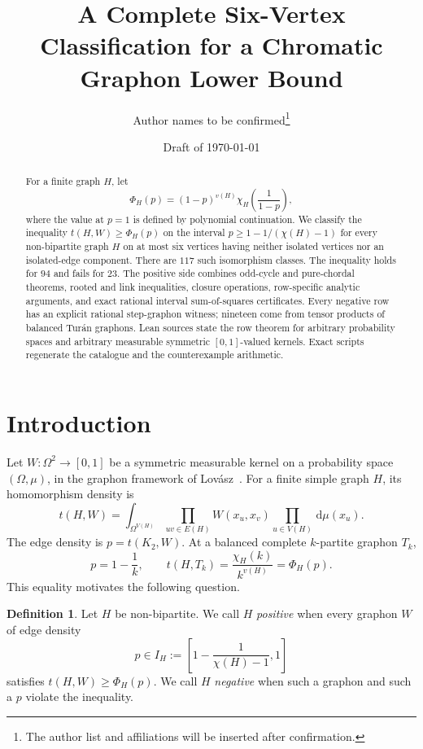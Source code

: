 \documentclass[11pt]{article}
\title{A Complete Six-Vertex Classification for a Chromatic Graphon Lower Bound}
\author{Author names to be confirmed\thanks{The author list and affiliations will be inserted after confirmation.}}
\date{Draft of \today}
\numberwithin{equation}{section}
\theoremstyle{definition}
\newtheorem{definition}[theorem]{Definition}
\theoremstyle{remark}
\newcommand{\dd}{\,\mathrm d}
\begin{document}
\maketitle

\begin{abstract}
For a finite graph $H$, let
\[
 \Phi_H(p)=(1-p)^{v(H)}\chi_H\!\left(\frac1{1-p}\right),
\]
where the value at $p=1$ is defined by polynomial continuation.  We classify
the inequality $t(H,W)\geq\Phi_H(p)$ on the interval
$p\geq1-1/(\chi(H)-1)$ for every non-bipartite graph $H$ on at most six
vertices having neither isolated vertices nor an isolated-edge component.
There are $117$ such isomorphism classes.  The inequality holds for $94$ and
fails for $23$.  The positive side combines odd-cycle and pure-chordal
theorems, rooted and link inequalities, closure operations, row-specific
analytic arguments, and exact rational interval sum-of-squares certificates.
Every negative row has an explicit rational step-graphon witness; nineteen
come from tensor products of balanced Tur\'{a}n graphons.  Lean sources state
the row theorem for arbitrary probability spaces and arbitrary measurable
symmetric $[0,1]$-valued kernels.  Exact scripts regenerate the catalogue and
the counterexample arithmetic.
\end{abstract}

\section{Introduction}

Let $W\colon\Omega^2\to[0,1]$ be a symmetric measurable kernel on a
probability space $(\Omega,\mu)$, in the graphon framework of
Lov\'asz~\cite{Lovasz2012}.  For a finite simple graph $H$, its
homomorphism density is
\begin{equation}
 t(H,W)=\int_{\Omega^{V(H)}}
 \prod_{uv\in E(H)}W(x_u,x_v)
 \prod_{u\in V(H)}\dd\mu(x_u).
 \label{eq:hom-density}
\end{equation}
The edge density is $p=t(K_2,W)$.  At a balanced complete $k$-partite
graphon $T_k$,
\begin{equation}
 p=1-\frac1k,
 \qquad
 t(H,T_k)=\frac{\chi_H(k)}{k^{v(H)}}=\Phi_H(p).
 \label{eq:turan-equality}
\end{equation}
This equality motivates the following question.

\begin{definition}
\label{def:positive}
Let $H$ be non-bipartite.  We call $H$ \emph{positive} when every graphon $W$
of edge density
\begin{equation}
 p\in I_H:=\left[1-\frac1{\chi(H)-1},1\right]
 \label{eq:required-interval}
\end{equation}
satisfies $t(H,W)\geq\Phi_H(p)$.  We call $H$ \emph{negative} when such a
graphon and such a $p$ violate the inequality.
\end{definition}
\end{document}
